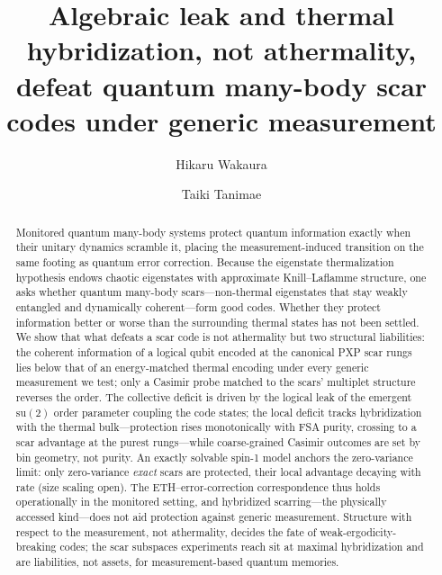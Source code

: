 \documentclass[a4paper,11pt,twocolumn,unpublished]{quantumarticle}
\begin{document}
\title{Algebraic leak and thermal hybridization, not athermality, defeat
quantum many-body scar codes under generic measurement}

\author{Hikaru Wakaura}
\author{Taiki Tanimae}

\maketitle

\begin{abstract}
Monitored quantum many-body systems protect quantum information exactly when
their unitary dynamics scramble it, placing the
measurement-induced transition on the same footing as quantum error correction.
Because the eigenstate thermalization hypothesis endows chaotic eigenstates with
approximate Knill--Laflamme structure, one asks whether quantum
many-body scars---non-thermal eigenstates that stay weakly entangled and
dynamically coherent---form good codes.
Whether they protect information better or worse than the surrounding thermal
states has not been settled.
We show that what defeats a scar code is not athermality but two
structural liabilities: the coherent information of a logical qubit encoded
at the canonical PXP scar rungs lies below that of an energy-matched thermal
encoding under every generic measurement we test; only a Casimir probe
matched to the scars' multiplet structure reverses the order.
The collective deficit is driven by the logical leak of the emergent
$\mathrm{su}(2)$ order parameter coupling the code states; the local
deficit tracks hybridization with the thermal bulk---protection
rises monotonically with FSA purity, crossing to a scar
advantage at the purest rungs---while coarse-grained Casimir outcomes are
set by bin geometry, not purity.
An exactly solvable spin-1 model anchors the zero-variance limit: only
zero-variance \emph{exact} scars are protected, their
local advantage decaying with rate (size scaling open). The ETH--error-correction correspondence thus holds
operationally in the monitored setting, and hybridized scarring---the
physically accessed kind---does not aid protection against generic
measurement.
Structure with respect to the measurement, not athermality, decides the
fate of weak-ergodicity-breaking codes; the scar subspaces
experiments reach sit at maximal hybridization and are liabilities, not
assets, for measurement-based quantum memories.
\end{abstract}
\end{document}
